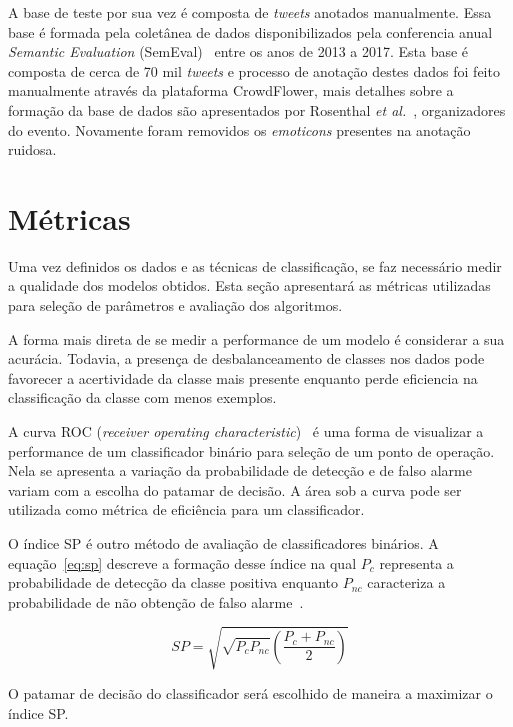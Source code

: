 A base de teste por sua vez é composta de \textit{tweets} anotados manualmente.
Essa base é formada pela coletânea de dados disponibilizados pela conferencia anual \textit{Semantic Evaluation}
(SemEval)~\cite{semeval17} entre os anos de 2013 a 2017.
Esta base é composta de cerca de 70 mil \textit{tweets} e processo de anotação destes dados foi feito manualmente
através da plataforma CrowdFlower, mais detalhes sobre a formação da base de dados são apresentados por Rosenthal
\textit{et al.}~\cite{rosenthal17}, organizadores do evento.
Novamente foram removidos os \textit{emoticons} presentes na anotação ruidosa.

\section{Métricas} \label{sec:metrics}

Uma vez definidos os dados e as técnicas de classificação, se faz necessário medir a qualidade dos modelos obtidos.
Esta seção apresentará as métricas utilizadas para seleção de parâmetros e avaliação dos algoritmos.

A forma mais direta de se medir a performance de um modelo é considerar a sua acurácia.
Todavia, a presença de desbalanceamento de classes nos dados pode favorecer a acertividade da classe mais presente
enquanto perde eficiencia na classificação da classe com menos exemplos.

A curva ROC (\textit{receiver operating characteristic})~\cite{bradley97} é uma forma de visualizar a performance de um
classificador binário para seleção de um ponto de operação.
Nela se apresenta a variação da probabilidade de detecção e de falso alarme variam com a escolha do patamar de decisão.
A área sob a curva pode ser utilizada como métrica de eficiência para um classificador.

O índice SP é outro método de avaliação de classificadores binários.
A equação~\ref{eq:sp} descreve a formação desse índice na qual $P_c$ representa a probabilidade de detecção da classe
positiva enquanto $P_{nc}$ caracteriza a probabilidade de não obtenção de falso alarme~\cite{ciodaro12}.

\begin{equation} \label{eq:sp}
    SP = \sqrt{\sqrt{P_c P_{nc}}(\frac{P_c + P_{nc}}{2})}
\end{equation}

O patamar de decisão do classificador será escolhido de maneira a maximizar o índice SP.

